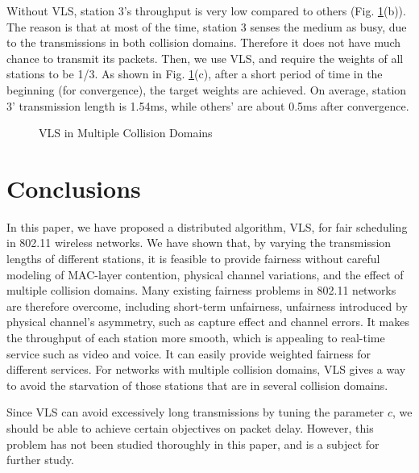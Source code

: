 \documentclass[letterpaper, 10 pt, conference]{ieeeconf}
\begin{document}
Without VLS, station 3's throughput is very low compared to others
(Fig. \ref{fig:VLS-in-Multiple}(b)). The reason is that at most of
the time, station 3 senses the medium as busy, due to the transmissions
in both collision domains. Therefore it does not have much chance
to transmit its packets. Then, we use VLS, and require the weights
of all stations to be 1/3. As shown in Fig. \ref{fig:VLS-in-Multiple}(c),
after a short period of time in the beginning (for convergence), the
target weights are achieved. On average, station 3' transmission length
is 1.54ms, while others' are about 0.5ms after convergence.

\begin{figure}
\noindent \begin{centering}
\par\end{centering}



\caption{\label{fig:VLS-in-Multiple}VLS in Multiple Collision Domains}
\end{figure}


\section{Conclusions}

In this paper, we have proposed a distributed algorithm, VLS, for
fair scheduling in 802.11 wireless networks. We have shown that, by
varying the transmission lengths of different stations, it is feasible
to provide fairness without careful modeling of MAC-layer contention,
physical channel variations, and the effect of multiple collision
domains. Many existing fairness problems in 802.11 networks are therefore
overcome, including short-term unfairness, unfairness introduced by
physical channel's asymmetry, such as capture effect and channel errors. 
It makes the throughput of each station more smooth, which is appealing to real-time service such as video and voice. It can easily provide weighted fairness for 
different services. For networks with multiple collision domains, VLS gives a way to avoid the starvation of those stations that are in several collision domains.

Since VLS can avoid excessively long transmissions by tuning the parameter
$c$, we should be able to achieve certain objectives on packet delay.
However, this problem has not been studied thoroughly in this paper,
and is a subject for further study.
\end{document}
